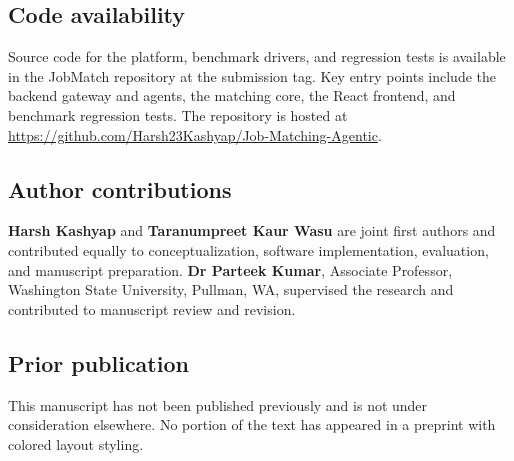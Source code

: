 \subsection*{Code availability}
Source code for the platform, benchmark drivers, and regression tests is available in the JobMatch repository at the submission tag.
Key entry points include the backend gateway and agents, the matching core, the React frontend, and benchmark regression tests.
The repository is hosted at \url{https://github.com/Harsh23Kashyap/Job-Matching-Agentic}.

\subsection*{Author contributions}
\textbf{Harsh Kashyap} and \textbf{Taranumpreet Kaur Wasu} are joint first authors and contributed equally to conceptualization, software implementation, evaluation, and manuscript preparation.
\textbf{Dr Parteek Kumar}, Associate Professor, Washington State University, Pullman, WA, supervised the research and contributed to manuscript review and revision.

\subsection*{Prior publication}
This manuscript has not been published previously and is not under consideration elsewhere.
No portion of the text has appeared in a preprint with colored layout styling.

